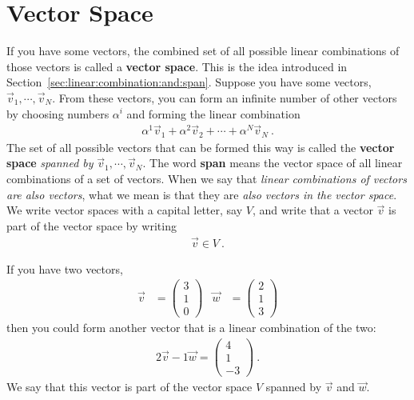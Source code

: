 \documentclass[12pt, oneside]{report}    %
\let\oldsection\section
\def\section{%
  \setcounter{sidenote}{1}%
  \oldsection
}
\begin{document}
\section{Vector Space}

If you have some vectors, the combined set of all possible linear combinations of those vectors is called a \textbf{vector space}. This is the idea introduced in Section~\ref{sec:linear:combination:and:span}. Suppose you have some vectors,  $\vec{v}_1, \cdots, \vec{v}_N$. From these vectors, you can form an infinite number of other vectors by choosing numbers $\alpha^i$ and forming the linear combination
\begin{align}
    \alpha^1 \vec{v}_1 + \alpha^2\vec{v}_2 + \cdots + \alpha^N \vec{v}_N \ .
    \label{eq:linear:combination:looks:like:basis}
\end{align}
The set of all possible vectors that can be formed this way is called the \textbf{vector space} \emph{spanned by}  $\vec{v}_1, \cdots, \vec{v}_N$. The word \textbf{span} means the vector space of all linear combinations of a set of vectors. When we say that \emph{linear combinations of vectors are also vectors}, what we mean is that they are \emph{also vectors in the vector space}. We write vector spaces with a capital letter, say $V$, and write that a vector $\vec{v}$ is part of the vector space by writing
\begin{align}
    \vec{v} \in V \ .
\end{align}

\begin{example}
If you have two vectors,
\begin{align}
    \vec{v} &= 
    \begin{pmatrix}
        3 \\ 1 \\ 0
    \end{pmatrix}
    &
    \vec{w} &= 
    \begin{pmatrix}
        2 \\ 1 \\ 3
    \end{pmatrix}
    \label{eq:eg:of:vector:space:1}
\end{align}
then you could form another vector that is a linear combination of the two:
\begin{align}
    2\vec{v} - 1 \vec{w}
    =
    \begin{pmatrix}
        4 \\ 1 \\ -3
    \end{pmatrix} \ .
\end{align}
We say that this vector is part of the vector space $V$ spanned by $\vec{v}$ and $\vec{w}$. 
\end{example}
\end{document}
